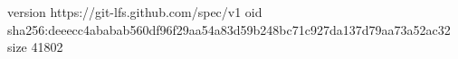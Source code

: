version https://git-lfs.github.com/spec/v1
oid sha256:deeecc4ababab560df96f29aa54a83d59b248bc71c927da137d79aa73a52ac32
size 41802
